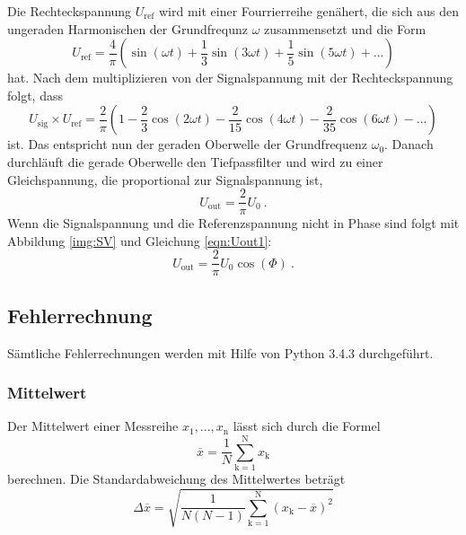 Die Rechteckspannung $U_\text{ref}$ wird mit einer Fourrierreihe genähert, die sich aus den ungeraden Harmonischen der Grundfrequnz $\omega$ zusammensetzt und die Form
\begin{equation}
	U_\text{ref} = \frac{4}{\pi} \left( \sin(\omega t) + \frac{1}{3} \sin(3 \omega t) + \frac{1}{5} \sin(5 \omega t) + ... \right)
\end{equation}
hat. Nach dem multiplizieren von der Signalspannung mit der Rechteckspannung folgt, dass
\begin{equation}
	U_\text{sig} \times U_\text{ref} = \frac{2}{\pi} \left(1 - \frac{2}{3} \cos(2 \omega t) - \frac{2}{15} \cos(4 \omega t) - \frac{2}{35} \cos(6 \omega t) - ... \right)
	\label{eqn:foye}
\end{equation}
ist. Das entspricht nun der geraden Oberwelle der Grundfrequenz $\omega_\text{0}$. Danach durchläuft die gerade Oberwelle den Tiefpassfilter und wird zu einer Gleichspannung, die proportional zur Signalspannung ist,
\begin{equation}
	U_\text{out} = \frac{2}{\pi} U_\text{0} \ .
	\label{eqn:Uout1}
\end{equation}
Wenn die Signalspannung und die Referenzspannung nicht in Phase sind folgt mit Abbildung \ref{img:SV} und Gleichung \ref{eqn:Uout1}:
\begin{equation}
	U_\text{out} = \frac{2}{\pi} U_\text{0} \cos(\Phi) \ .
	\label{eqn:Uout2}
\end{equation}
\newpage

\subsection{Fehlerrechnung}
Sämtliche Fehlerrechnungen werden mit Hilfe von Python 3.4.3 durchgeführt.
\subsubsection{Mittelwert}
Der Mittelwert einer Messreihe $x_\text{1}, ... ,x_\text{n}$ lässt sich durch die Formel
\begin{equation}
	\overline{x} = \frac{1}{N} \sum_{\text{k}=1}^\text{N} x_\text{k}
	\label{eqn:ave}
\end{equation}
berechnen. Die Standardabweichung des Mittelwertes beträgt
\begin{equation}
	\Delta \overline{x} = \sqrt{ \frac{1}{N(N-1)} \sum_{\text{k}=1}^\text{N} (x_\text{k} - \overline{x})^2}
	\label{eqn:std}
\end{equation}


